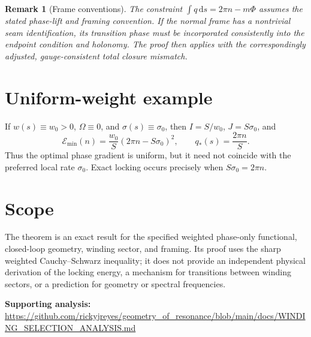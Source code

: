\documentclass[11pt]{article}
\newtheorem{remark}[theorem]{Remark}
\newcommand{\dd}{\,\mathrm{d}}
\newcommand{\E}{\mathcal{E}}
\begin{document}
\begin{remark}[Frame conventions]
The constraint $\int q\dd s=2\pi n-m\Phi$ assumes the stated phase-lift
and framing convention.  If the normal frame has a nontrivial seam
identification, its transition phase must be incorporated consistently into
the endpoint condition and holonomy.  The proof then applies with the
correspondingly adjusted, gauge-consistent total closure mismatch.
\end{remark}

\section{Uniform-weight example}

If $w(s)\equiv w_0>0$, $\Omega\equiv0$, and $\sigma(s)\equiv\sigma_0$,
then $I=S/w_0$, $J=S\sigma_0$, and
\begin{equation}
  \E_{\min}(n)=\frac{w_0}{S}(2\pi n-S\sigma_0)^2,
  \qquad
  q_*(s)=\frac{2\pi n}{S}.
\end{equation}
Thus the optimal phase gradient is uniform, but it need not coincide with
the preferred local rate $\sigma_0$.  Exact locking occurs precisely when
$S\sigma_0=2\pi n$.

\section*{Scope}
The theorem is an exact result for the specified weighted phase-only
functional, closed-loop geometry, winding sector, and framing.  Its proof
uses the sharp weighted Cauchy--Schwarz inequality; it does not provide an
independent physical derivation of the locking energy, a mechanism for
transitions between winding sectors, or a prediction for geometry or
spectral frequencies.

\noindent\textbf{Supporting analysis:}
\url{https://github.com/rickyjreyes/geometry_of_resonance/blob/main/docs/WINDING_SELECTION_ANALYSIS.md}
\end{document}
